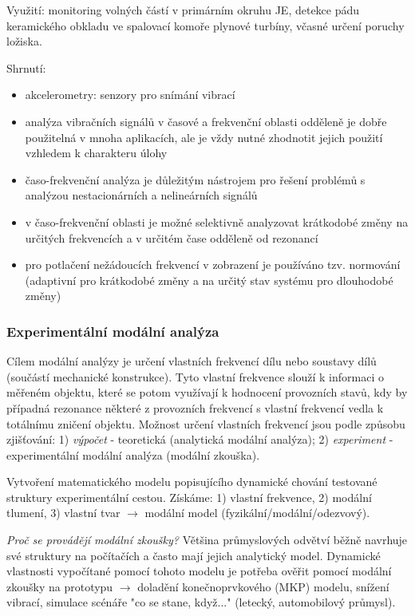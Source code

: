 Využití: monitoring volných částí v primárním okruhu JE, detekce pádu keramického obkladu ve spalovací komoře plynové turbíny, včasné určení poruchy ložiska.

Shrnutí:
\begin{itemize}
\item akcelerometry: senzory pro snímání vibrací
\item analýza vibračních signálů v časové a frekvenční oblasti odděleně je dobře použitelná v mnoha aplikacích, ale je vždy nutné zhodnotit jejich použití vzhledem k charakteru úlohy
\item časo-frekvenční analýza je důležitým nástrojem pro řešení problémů s analýzou nestacionárních a nelineárních signálů
\item v časo-frekvenční oblasti je možné selektivně analyzovat krátkodobé změny na určitých frekvencích a v určitém čase odděleně od rezonancí
\item pro potlačení nežádoucích frekvencí v zobrazení je používáno tzv. normování (adaptivní pro krátkodobé změny a na určitý stav systému pro dlouhodobé změny)
\end{itemize}

\subsubsection*{Experimentální modální analýza}
Cílem modální analýzy je určení vlastních frekvencí dílu nebo soustavy dílů (součástí mechanické konstrukce). Tyto vlastní frekvence slouží k informaci o měřeném objektu, které se potom využívají k hodnocení provozních stavů, kdy by případná rezonance některé z provozních frekvencí s vlastní frekvencí vedla k totálnímu zničení objektu. Možnost určení vlastních frekvencí jsou podle způsobu zjišťování: 1) \textit{výpočet} - teoretická (analytická modální analýza); 2) \textit{experiment} - experimentální modální analýza (modální zkouška).

Vytvoření matematického modelu popisujícího dynamické chování testované struktury experimentální cestou. Získáme: 1) vlastní frekvence, 2) modální tlumení, 3) vlastní tvar $ \to $ modální model (fyzikální/modální/odezvový).

\textit{Proč se provádějí modální zkoušky?} Většina průmyslových odvětví běžně navrhuje své struktury na počítačích a často mají jejich analytický model. Dynamické vlastnosti vypočítané pomocí tohoto modelu je potřeba ověřit pomocí modální zkoušky na prototypu $ \to $ doladění konečnoprvkového (MKP) modelu, snížení vibrací, simulace scénáře "co se stane, když..." (letecký, automobilový průmysl).

